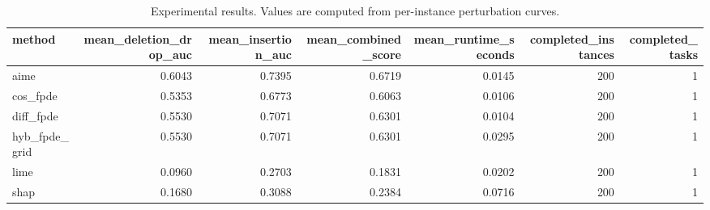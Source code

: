 \begin{table}[t]
\caption{Experimental results. Values are computed from per-instance perturbation curves.}
\label{tab:main_results_computed}
\centering
\begin{tabular}{lrrrrrr}
\toprule
method & mean\_deletion\_drop\_auc & mean\_insertion\_auc & mean\_combined\_score & mean\_runtime\_seconds & completed\_instances & completed\_tasks \\
\midrule
aime & 0.6043 & 0.7395 & 0.6719 & 0.0145 & 200 & 1 \\
cos\_fpde & 0.5353 & 0.6773 & 0.6063 & 0.0106 & 200 & 1 \\
diff\_fpde & 0.5530 & 0.7071 & 0.6301 & 0.0104 & 200 & 1 \\
hyb\_fpde\_grid & 0.5530 & 0.7071 & 0.6301 & 0.0295 & 200 & 1 \\
lime & 0.0960 & 0.2703 & 0.1831 & 0.0202 & 200 & 1 \\
shap & 0.1680 & 0.3088 & 0.2384 & 0.0716 & 200 & 1 \\
\bottomrule
\end{tabular}

\end{table}

